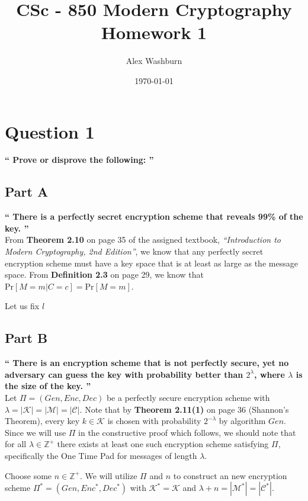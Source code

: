 \documentclass{article}
\title{CSc - 850 Modern Cryptography\\ Homework 1}
\author{Alex Washburn}
\date\today
\newcommand{\HomeworkText}[1]{\textbf{``#1''}\\}
\begin{document}

	\maketitle
	\vspace*{4cm}

	\restoregeometry
	
	\clearpage
	\section*{Question 1}
	\HomeworkText{
		Prove or disprove the following:
	}

	\subsection*{Part A}
	\HomeworkText{
		There is a perfectly secret encryption scheme that reveals 99\% of the key.
	}

	From \textbf{Theorem 2.10} on page 35 of the assigned textbook, \emph{``Introduction to Modern Cryptography, 2nd Edition''}, we know that any perfectly secret encryption scheme must have a key space that is at least as large as the message space. From \textbf{Definition 2.3} on page 29, we know that $\text{Pr}[M = m | C = c] = \text{Pr}[M = m]$.
	
	Let us fix $l$
	

	\subsection*{Part B}
	\HomeworkText{
		There is an encryption scheme that is not perfectly secure, yet no adversary can guess the key with probability better than $2^{\lambda}$, where $\lambda$ is the size of the key.
	}

    Let $\Pi = (Gen,Enc,Dec)$ be a perfectly secure encryption scheme with $\lambda = |\mathcal{K}| = |\mathcal{M}| = |\mathcal{C}|$.
    Note that by \textbf{Theorem 2.11(1)} on page 36 (Shannon's Theorem), every key $k \in \mathcal{K}$ is chosen with probability $2^{-\lambda}$ by algorithm $Gen$.
    Since we will use $\Pi$ in the constructive proof which follows, we should note that for all $\lambda \in \mathbb{Z}^{+}$ there exists at least one such encryption scheme satisfying $\Pi$, specifically the One Time Pad for messages of length $\lambda$.
    
    Choose some $n \in \mathbb{Z}^{+}$. We will utilize $\Pi$ and $n$ to construct an new encryption scheme $\Pi^{*} = (Gen,Enc^{*},Dec^{*})$ with $\mathcal{K}^{*} = \mathcal{K}$ and $\lambda + n = |\mathcal{M}^{*}| = |\mathcal{C}^{*}|$. 
    
\end{document}
